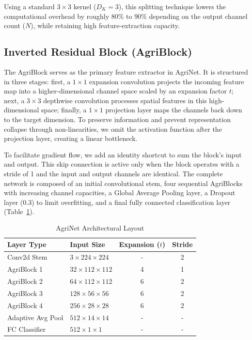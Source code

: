 \documentclass[12pt, a4paper]{report}
\begin{document}
Using a standard $3 \times 3$ kernel ($D_K = 3$), this splitting technique lowers the computational overhead by roughly 80\% to 90\% depending on the output channel count ($N$), while retaining high feature-extraction capacity.

\subsection{Inverted Residual Block (AgriBlock)}
The AgriBlock serves as the primary feature extractor in AgriNet. It is structured in three stages: first, a $1 \times 1$ expansion convolution projects the incoming feature map into a higher-dimensional channel space scaled by an expansion factor $t$; next, a $3 \times 3$ depthwise convolution processes spatial features in this high-dimensional space; finally, a $1 \times 1$ projection layer maps the channels back down to the target dimension. To preserve information and prevent representation collapse through non-linearities, we omit the activation function after the projection layer, creating a linear bottleneck.

To facilitate gradient flow, we add an identity shortcut to sum the block's input and output. This skip connection is active only when the block operates with a stride of 1 and the input and output channels are identical. The complete network is composed of an initial convolutional stem, four sequential AgriBlocks with increasing channel capacities, a Global Average Pooling layer, a Dropout layer ($0.3$) to limit overfitting, and a final fully connected classification layer (Table~\ref{tab:agrinet_layout}).

\begin{table}[H]
\centering
\caption{AgriNet Architectural Layout}
\vspace{0.3cm}
\begin{tabular}{@{}llcc@{}}
\toprule
\textbf{Layer Type} & \textbf{Input Size} & \textbf{Expansion ($t$)} & \textbf{Stride} \\
\midrule
Conv2d Stem & $3\times224\times224$ & - & 2 \\
AgriBlock 1 & $32\times112\times112$ & 4 & 1 \\
AgriBlock 2 & $64\times112\times112$ & 6 & 2 \\
AgriBlock 3 & $128\times56\times56$ & 6 & 2 \\
AgriBlock 4 & $256\times28\times28$ & 6 & 2 \\
Adaptive Avg Pool & $512\times14\times14$ & - & - \\
FC Classifier & $512\times1\times1$ & - & - \\
\bottomrule
\end{tabular}
\label{tab:agrinet_layout}
\end{table}
\end{document}
